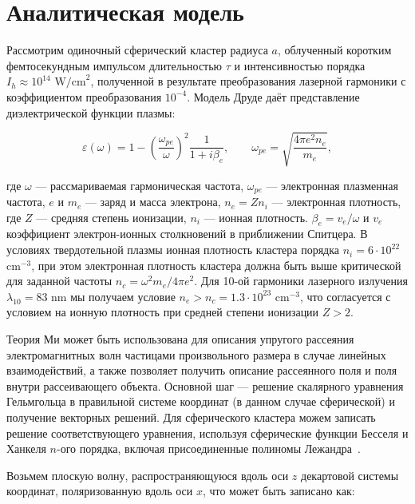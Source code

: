 \section{Аналитическая модель}

Рассмотрим одиночный сферический кластер радиуса $a$, облученный коротким фемтосекундным импульсом длительностью $\tau$ и интенсивностью порядка $I_{h} \approx 10^{14}$ $\textrm{W/cm}^2$, полученной в результате преобразования лазерной гармоники с коэффициентом преобразования $10^{-4}$. Модель Друде даёт представление диэлектрической функции плазмы:

    \begin{equation}
		\varepsilon (\omega) = 1 - {\left( \frac{\omega_{pe}}{\omega} \right)}^2 \frac{1}{1+i \beta_{e}}, \qquad \omega_{pe} = \sqrt{\frac{4 \pi e^2 n_e}{m_e}},
		\label{eps_plasma}
    \end{equation}

\noindent где $\omega$ --- рассмариваемая гармоническая частота, $\omega_{pe}$ --- электронная плазменная частота, $e$ и $m_e$ --- заряд и масса электрона, $n_e = Z n_i$ --- электронная плотность, где $Z$ --- средняя степень ионизации, $n_i$ --- ионная плотность. $\beta_{e} = v_e / \omega$ и $v_e$ коэффициент электрон-ионных столкновений в приближении Спитцера. В условиях твердотельной плазмы ионная плотность кластера порядка $n_i = 6 \cdot 10^{22}$ $\textrm{cm}^{-3}$, при этом электронная плотность кластера должна быть выше критической для заданной частоты $n_c = \omega^2 m_e / 4 \pi e^2$. Для 10-ой гармоники лазерного излучения $\lambda_{10} = 83$ nm мы получаем условие $n_e > n_c = 1.3 \cdot 10^{23}$ $\textrm{cm}^{-3}$, что согласуется с условием на ионную плотность при средней степени ионизации $Z > 2$.

Теория Ми может быть использована для описания упругого рассеяния электромагнитных волн частицами произвольного размера в случае линейных взаимодействий, а также позволяет получить описание рассеянного поля и поля внутри рассеивающего объекта. Основной шаг --- решение скалярного уравнения Гельмгольца в правильной системе координат (в данном случае сферической) и получение векторных решений. Для сферического кластера можем записать решение соответствующего уравнения, используя сферические функции Бесселя и Ханкеля $n$-ого порядка, включая присоединенные полиномы Лежандра~\cite{boren_huffman}.

Возьмем плоскую волну, распространяющуюся вдоль оси $z$ декартовой системы координат, поляризованную вдоль оси $x$, что может быть записано как:

